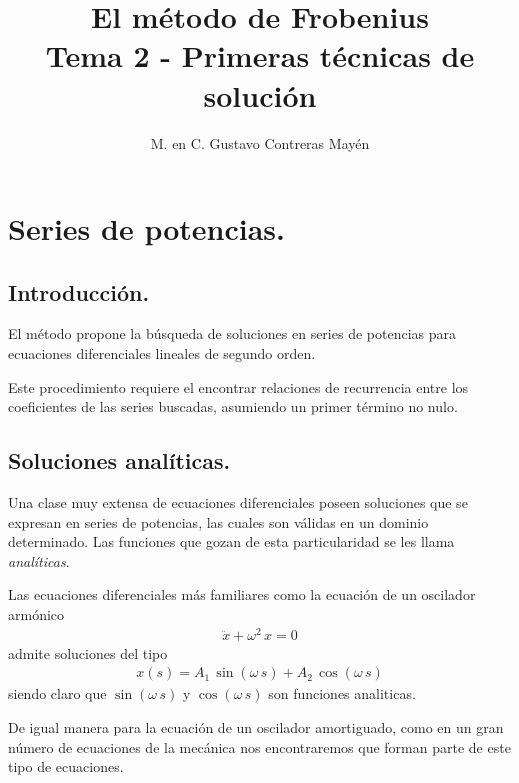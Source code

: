
\usepackage{apacite}
\title{El método de Frobenius \\[0.3em]  \large{Tema 2 - Primeras técnicas de solución}\vspace{-3ex}}
\author{M. en C. Gustavo Contreras Mayén}
\date{ }

\vspace{-4cm}
\maketitle
\fontsize{14}{14}\selectfont
\tableofcontents
\newpage
\section{Series de potencias.}
\subsection{Introducción.}

El método propone la búsqueda de soluciones en series de potencias para ecuaciones diferenciales lineales de segundo orden.
\par
Este procedimiento requiere el encontrar relaciones de recurrencia entre los coeficientes de las series buscadas, asumiendo un primer término no nulo.
\subsection{Soluciones analíticas.}

Una clase muy extensa de ecuaciones diferenciales poseen soluciones que se expresan en series de potencias, las cuales son válidas en un dominio determinado. Las funciones que gozan de esta particularidad se les llama \emph{analíticas}.
\par
Las ecuaciones diferenciales más familiares como la ecuación de un oscilador armónico
 \begin{align*}
\ddot{x} + \omega^{2} \, x = 0
 \end{align*}
admite soluciones del tipo
\begin{align*}
x(s) = A_{1} \, \sin( \omega \, s) + A_{2} \, \cos (\omega \, s)
\end{align*}
siendo claro que $\sin( \omega \, s)$ y $\cos( \omega \, s)$ son funciones analiticas.
\par
De igual manera para la ecuación de un oscilador amortiguado, como en un gran número de ecuaciones de la mecánica nos encontraremos que forman parte de este tipo de ecuaciones.
